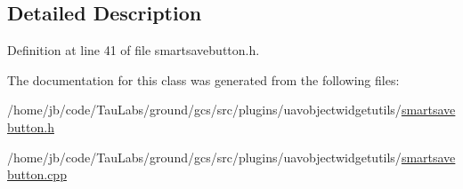 \subsection{\-Detailed \-Description}


\-Definition at line 41 of file smartsavebutton.\-h.



\-The documentation for this class was generated from the following files\-:\begin{DoxyCompactItemize}
\item 
/home/jb/code/\-Tau\-Labs/ground/gcs/src/plugins/uavobjectwidgetutils/\hyperlink{smartsavebutton_8h}{smartsavebutton.\-h}\item 
/home/jb/code/\-Tau\-Labs/ground/gcs/src/plugins/uavobjectwidgetutils/\hyperlink{smartsavebutton_8cpp}{smartsavebutton.\-cpp}\end{DoxyCompactItemize}
